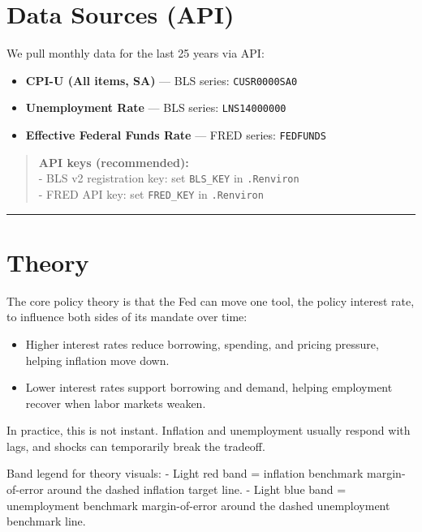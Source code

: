 \documentclass[
  11pt,
]{article}
\providecommand{\tightlist}{%
  \setlength{\itemsep}{0pt}\setlength{\parskip}{0pt}}
\begin{document}
\section{Data Sources (API)}\label{data-sources-api}

We pull monthly data for the last 25 years via API:

\begin{itemize}
\tightlist
\item
  \textbf{CPI-U (All items, SA)} --- BLS series: \texttt{CUSR0000SA0}\\
\item
  \textbf{Unemployment Rate} --- BLS series: \texttt{LNS14000000}\\
\item
  \textbf{Effective Federal Funds Rate} --- FRED series:
  \texttt{FEDFUNDS}
\end{itemize}

\begin{quote}
\textbf{API keys (recommended):}\\
- BLS v2 registration key: set \texttt{BLS\_KEY} in \texttt{.Renviron}\\
- FRED API key: set \texttt{FRED\_KEY} in \texttt{.Renviron}
\end{quote}

\begin{center}\rule{0.5\linewidth}{0.5pt}\end{center}

\section{Theory}\label{theory}

The core policy theory is that the Fed can move one tool, the policy
interest rate, to influence both sides of its mandate over time:

\begin{itemize}
\tightlist
\item
  Higher interest rates reduce borrowing, spending, and pricing
  pressure, helping inflation move down.
\item
  Lower interest rates support borrowing and demand, helping employment
  recover when labor markets weaken.
\end{itemize}

In practice, this is not instant. Inflation and unemployment usually
respond with lags, and shocks can temporarily break the tradeoff.

Band legend for theory visuals: - Light red band = inflation benchmark
margin-of-error around the dashed inflation target line. - Light blue
band = unemployment benchmark margin-of-error around the dashed
unemployment benchmark line.
\end{document}

